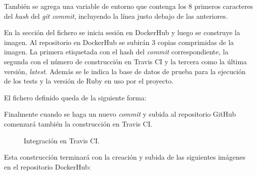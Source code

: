 También se agrega una variable de entorno que contenga los 8 primeros caracteres del \textit{hash} del \textit{git commit}, incluyendo la línea  justo debajo de las anteriores.

En la sección  del fichero se inicia sesión en DockerHub y luego se construye la imagen. Al repositorio en DockerHub se subirán 3 copias comprimidas de la imagen. La primera etiquetada con el hash del \textit{commit} correspondiente, la segunda con el número de construcción en Travis CI y la tercera como la última versión, \textit{latest}. Además se le indica la base de datos de prueba para la ejecución de los tests y la versión de Ruby en uso por el proyecto.

El fichero definido queda de la siguiente forma:

\begin{codelisting}
\label{code:travis}
\end{codelisting}

Finalmente cuando se haga un nuevo \textit{commit} y subida al repositorio GitHub comenzará también la construcción en Travis CI.

\begin{figure}[H]
\caption{Integración en Travis CI.\label{fig:figure_placement_example}}
\end{figure}

Esta construcción terminará con la creación y subida de las siguientes imágenes en el repositorio DockerHub:

